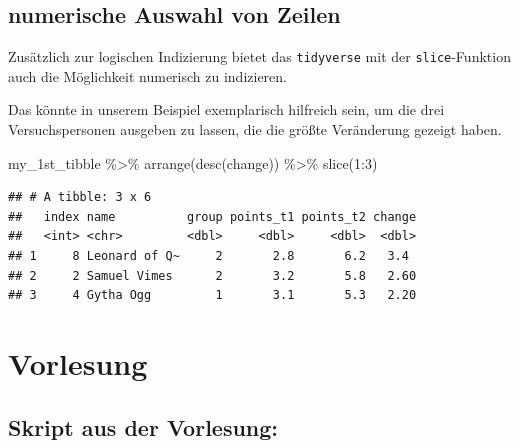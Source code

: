 \documentclass[
]{book}
\newenvironment{Shaded}{\begin{snugshade}}{\end{snugshade}}
\newcommand{\DecValTok}[1]{\textcolor[rgb]{0.00,0.00,0.81}{#1}}
\newcommand{\FunctionTok}[1]{\textcolor[rgb]{0.00,0.00,0.00}{#1}}
\newcommand{\NormalTok}[1]{#1}
\newcommand{\SpecialCharTok}[1]{\textcolor[rgb]{0.00,0.00,0.00}{#1}}
\begin{document}
\hypertarget{numerische-auswahl-von-zeilen}{%
\subsection{numerische Auswahl von Zeilen}\label{numerische-auswahl-von-zeilen}}

Zusätzlich zur logischen Indizierung bietet das \texttt{tidyverse} mit der \texttt{slice}-Funktion auch die Möglichkeit numerisch zu indizieren.

Das könnte in unserem Beispiel exemplarisch hilfreich sein, um die drei Versuchspersonen ausgeben zu lassen, die die größte Veränderung gezeigt haben.

\begin{Shaded}
\begin{Highlighting}[]
\NormalTok{my\_1st\_tibble }\SpecialCharTok{\%\textgreater{}\%} 
  \FunctionTok{arrange}\NormalTok{(}\FunctionTok{desc}\NormalTok{(change)) }\SpecialCharTok{\%\textgreater{}\%} 
  \FunctionTok{slice}\NormalTok{(}\DecValTok{1}\SpecialCharTok{:}\DecValTok{3}\NormalTok{)}
\end{Highlighting}
\end{Shaded}

\begin{verbatim}
## # A tibble: 3 x 6
##   index name          group points_t1 points_t2 change
##   <int> <chr>         <dbl>     <dbl>     <dbl>  <dbl>
## 1     8 Leonard of Q~     2       2.8       6.2   3.4 
## 2     2 Samuel Vimes      2       3.2       5.8   2.60
## 3     4 Gytha Ogg         1       3.1       5.3   2.20
\end{verbatim}

\hypertarget{vorlesung}{%
\section{Vorlesung}\label{vorlesung}}

\hypertarget{skript-aus-der-vorlesung}{%
\subsection{Skript aus der Vorlesung:}\label{skript-aus-der-vorlesung}}
\end{document}
